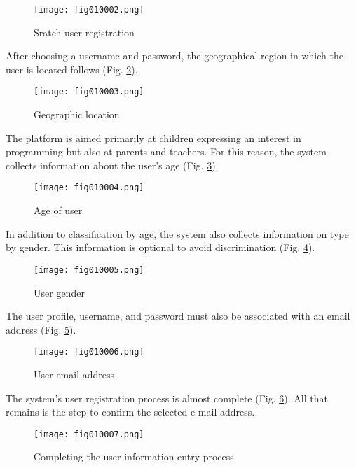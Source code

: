 \begin{figure}[H]
   \centering
   \texttt{[image: fig010002.png]}
   \caption{Sratch user registration}
\label{fig010002}
\end{figure}

After choosing a username and password, the geographical region in which the user is located follows (Fig. \ref{fig010003}).

\begin{figure}[H]
   \centering
   \texttt{[image: fig010003.png]}
   \caption{Geographic location}
\label{fig010003}
\end{figure}

The platform is aimed primarily at children expressing an interest in programming but also at parents and teachers. For this reason, the system collects information about the user's age (Fig. \ref{fig010004}).

\begin{figure}[H]
   \centering
   \texttt{[image: fig010004.png]}
   \caption{Age of user}
\label{fig010004}
\end{figure}

In addition to classification by age, the system also collects information on type by gender. This information is optional to avoid discrimination (Fig. \ref{fig010005}).

\begin{figure}[H]
   \centering
   \texttt{[image: fig010005.png]}
   \caption{User gender}
\label{fig010005}
\end{figure}

The user profile, username, and password must also be associated with an email address (Fig. \ref{fig010006}).

\begin{figure}[H]
   \centering
   \texttt{[image: fig010006.png]}
   \caption{User email address}
\label{fig010006}
\end{figure}

The system's user registration process is almost complete (Fig. \ref{fig010007}). All that remains is the step to confirm the selected e-mail address.

\begin{figure}[H]
   \centering
   \texttt{[image: fig010007.png]}
   \caption{Completing the user information entry process}
\label{fig010007}
\end{figure}

